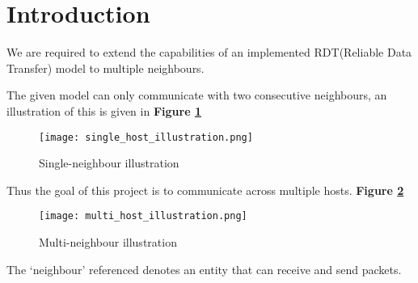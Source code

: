 \section{Introduction}
We are required to extend the capabilities of an implemented RDT(Reliable Data Transfer) model to multiple neighbours.

The given model can only communicate with two consecutive neighbours, an illustration of this is given in \textbf{Figure \ref{fig:single_host_illustration}}

\begin{figure}[H]\center
 \texttt{[image: single\_host\_illustration.png]}
 \caption{Single-neighbour illustration}
 \label{fig:single_host_illustration}
\end{figure}


Thus the goal of this project is to communicate across multiple hosts. \textbf{Figure \ref{fig:multi_host_illustration}}
\begin{figure}[H]\center
 \texttt{[image: multi\_host\_illustration.png]}
 \caption{Multi-neighbour illustration}
 \label{fig:multi_host_illustration}
\end{figure}


The `neighbour' referenced denotes an entity that can receive and send packets.
